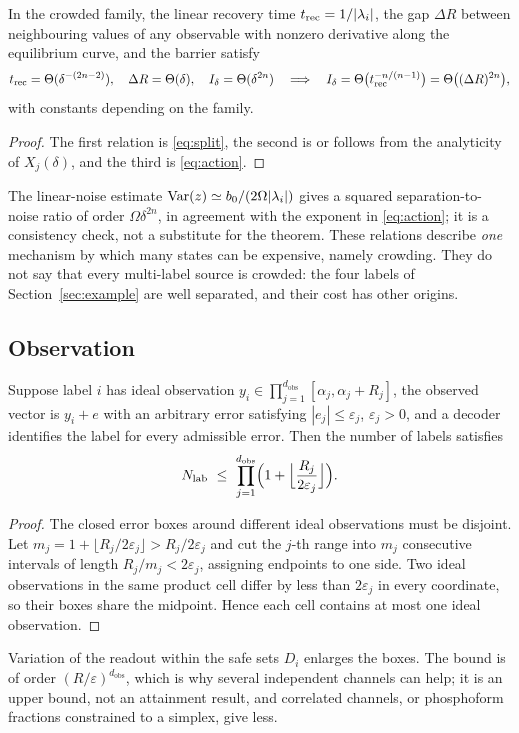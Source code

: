 \begin{corollary}\label{cor:tradeoff}
In the crowded family, the linear recovery time \(t_{\mathrm{rec}}=1/|\lambda_i|\), the gap
\(\Delta R\) between neighbouring values of any observable with nonzero derivative along the
equilibrium curve, and the barrier satisfy
\[
 t_{\mathrm{rec}}=\Theta(\delta^{-(2n-2)}),\quad \Delta R=\Theta(\delta),\quad
 I_\delta=\Theta(\delta^{2n})
 \quad\Longrightarrow\quad
 I_\delta=\Theta\bigl(t_{\mathrm{rec}}^{-n/(n-1)}\bigr)=\Theta\bigl((\Delta R)^{2n}\bigr),
\]
with constants depending on the family.
\end{corollary}
\begin{proof}
The first relation is \eqref{eq:split}, the second is \cite[Corollary~8.4]{Companion} or
follows from the analyticity of \(X_j(\delta)\), and the third is \eqref{eq:action}.
\end{proof}
The linear-noise estimate \(\operatorname{Var}(z)\simeq b_0/(2\Omega|\lambda_i|)\) gives a squared
separation-to-noise ratio of order \(\Omega\delta^{2n}\), in agreement with the exponent in
\eqref{eq:action}; it is a consistency check, not a substitute for the theorem. These relations
describe \emph{one} mechanism by which many states can be expensive, namely crowding. They do
not say that every multi-label source is crowded: the four labels of
Section~\ref{sec:example} are well separated, and their cost has other origins.

\subsection{Observation}
\begin{proposition}\label{prop:packing}
Suppose label \(i\) has ideal observation \(y_i\in\prod_{j=1}^{d_{\mathrm{obs}}}[\alpha_j,\alpha_j+R_j]\), the
observed vector is \(y_i+e\) with an arbitrary error satisfying
\(|e_j|\le\varepsilon_j\), \(\varepsilon_j>0\), and a decoder identifies the label for every
admissible error. Then the number of labels satisfies
\[
 N_{\mathrm{lab}}\ \le\ \prod_{j=1}^{d_{\mathrm{obs}}}\Bigl(1+\Bigl\lfloor\frac{R_j}{2\varepsilon_j}\Bigr\rfloor\Bigr).
\]
\end{proposition}
\begin{proof}
The closed error boxes around different ideal observations must be disjoint. Let
\(m_j=1+\lfloor R_j/2\varepsilon_j\rfloor>R_j/2\varepsilon_j\) and cut the \(j\)-th range into
\(m_j\) consecutive intervals of length \(R_j/m_j<2\varepsilon_j\), assigning endpoints to one
side. Two ideal observations in the same product cell differ by less than \(2\varepsilon_j\)
in every coordinate, so their boxes share the midpoint. Hence each cell contains at most one
ideal observation.
\end{proof}
Variation of the readout within the safe sets \(D_i\) enlarges the boxes. The bound is of order
\((R/\varepsilon)^{d_{\mathrm{obs}}}\), which is why several independent channels can help; it is an
upper bound, not an attainment result, and correlated channels, or phosphoform fractions
constrained to a simplex, give less.


